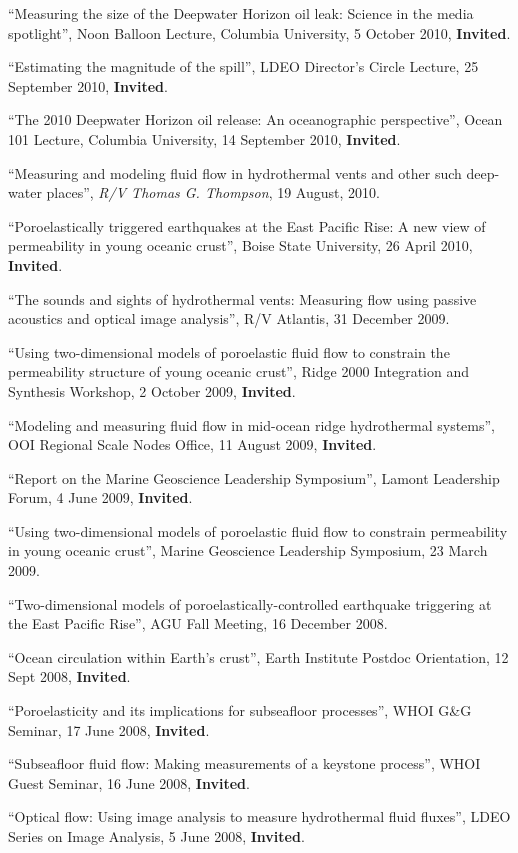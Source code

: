 \documentclass[11pt]{res}
\begin{document}
\begin{resume}
``Measuring the size of the Deepwater Horizon oil leak: Science in the media spotlight'', Noon Balloon Lecture, Columbia University, 5 October 2010, {\bf Invited}.

``Estimating the magnitude of the spill'', LDEO Director's Circle Lecture, 25 September 2010, {\bf Invited}.

``The 2010 Deepwater Horizon oil release: An oceanographic perspective'', Ocean 101 Lecture, Columbia University, 14 September 2010, {\bf Invited}.

``Measuring and modeling fluid flow in hydrothermal vents and other such deep-water places'', {\em R/V Thomas G. Thompson}, 19 August, 2010.

``Poroelastically triggered earthquakes at the East Pacific Rise: A new view of permeability in young oceanic crust'', Boise State University, 26 April 2010, {\bf Invited}.

``The sounds and sights of hydrothermal vents: Measuring flow using passive acoustics and optical image analysis'', {\rm R/V Atlantis}, 31 December 2009.

``Using two-dimensional models of poroelastic fluid flow to constrain the permeability structure of young oceanic crust'', Ridge 2000 Integration and Synthesis Workshop, 2 October 2009, {\bf Invited}.

``Modeling and measuring fluid flow in mid-ocean ridge hydrothermal systems'', OOI Regional Scale Nodes Office, 11 August 2009, {\bf Invited}.

``Report on the Marine Geoscience Leadership Symposium'', Lamont Leadership Forum, 4 June 2009, {\bf Invited}.

``Using two-dimensional models of poroelastic fluid flow to constrain permeability in young oceanic crust'', Marine Geoscience Leadership Symposium, 23 March 2009.

``Two-dimensional models of poroelastically-controlled earthquake triggering at the East Pacific Rise'', AGU Fall Meeting, 16 December 2008.

``Ocean circulation within Earth's crust'', Earth Institute Postdoc Orientation, 12 Sept 2008, {\bf Invited}.

``Poroelasticity and its implications for subseafloor processes'', WHOI G\&G Seminar, 17 June 2008, {\bf Invited}.

``Subseafloor fluid flow: Making measurements of a keystone process'', WHOI Guest Seminar, 16 June 2008, {\bf Invited}.

``Optical flow: Using image analysis to measure hydrothermal fluid fluxes'', LDEO Series on Image Analysis, 5 June 2008, {\bf Invited}.


\end{resume}
\end{document}
